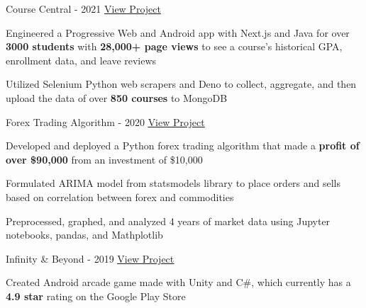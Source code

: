 

\begin{cventries}

  \cventry
    {} %
    {Course Central - 2021} %
    {\href{https://coursecentral.ca/}{\underline{View Project}}} %
    {} %
    {
      \begin{cvitems} %
        \item {Engineered a Progressive Web and Android app with Next.js and Java for over \textbf{3000 students} with \textbf{28,000+ page views} to see a course's historical GPA, enrollment data, and leave reviews}
        \item {Utilized Selenium Python web scrapers and Deno to collect, aggregate, and then upload the data of over \textbf{850 courses} to MongoDB}
      \end{cvitems}
    }

  \cventry
    {} %
    {Forex Trading Algorithm - 2020} %
    {\href{https://github.com/KnlnKS/Forex-Price-Predictor-Quantconnect}{\underline{View Project}}} %
    {} %
    {
      \begin{cvitems} %
        \item {Developed and deployed a Python forex trading algorithm that made a \textbf{profit of over \$90,000} from an investment of \$10,000}
        \item {Formulated ARIMA model from statsmodels library to place orders and sells based on correlation between forex and commodities}
        \item {Preprocessed, graphed, and analyzed 4 years of market data using Jupyter notebooks, pandas, and Mathplotlib}
      \end{cvitems}
    }

  \cventry
    {} %
    {Infinity \& Beyond - 2019} %
    {\href{https://play.google.com/store/apps/details?id=com.KKSGames.InifintyandBeyond}{\underline{View Project}}} %
    {} %
    {
      \begin{cvitems} %
        \item {Created Android arcade game made with Unity and C\#, which currently has a  \textbf{4.9 star} rating on the Google Play Store}
      \end{cvitems}
    }


\end{cventries}
